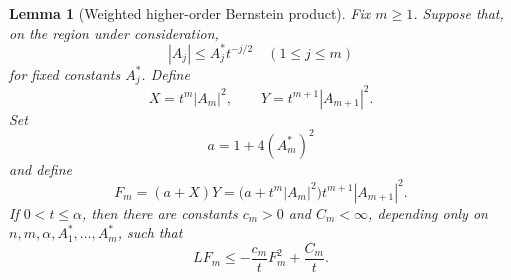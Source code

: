 \documentclass[10pt]{coll-l}
\newtheorem{lemma}[theorem]{Lemma}
\theoremstyle{definition}
\theoremstyle{remark}
\numberwithin{section}{chapter}
\numberwithin{equation}{chapter}
\begin{document}
\begin{lemma}[Weighted higher-order Bernstein product]
\label{lem:shi-higher-bernstein-product}
Fix $m\geq1$.  Suppose that, on the region under consideration,
\begin{equation}
             |A_j|\leq A_j^*t^{-j/2}
             \quad(1\leq j\leq m)                        \label{eq:shi-induction-hypothesis}
\end{equation}
for fixed constants $A_j^*$.  Define
\begin{equation}
 X=t^m|A_m|^2,
 \qquad Y=t^{m+1}|A_{m+1}|^2.                            \label{eq:shi-XY}
\end{equation}
Set
\begin{equation}
                         a=1+4(A_m^*)^2                  \label{eq:shi-a-choice}
\end{equation}
and define
\begin{equation}
 F_m=(a+X)Y
   =\bigl(a+t^m|A_m|^2\bigr)
       t^{m+1}|A_{m+1}|^2.                               \label{eq:shi-Fm}
\end{equation}
If $0<t\leq\alpha$, then there are constants $c_m>0$ and $C_m<\infty$,
depending only on $n,m,\alpha,A_1^*,\ldots,A_m^*$, such that
\begin{equation}
                    LF_m\leq-\frac{c_m}{t}F_m^2
                                   +\frac{C_m}{t}.        \label{eq:shi-Fm-good}
\end{equation}
\end{lemma}
\end{document}
